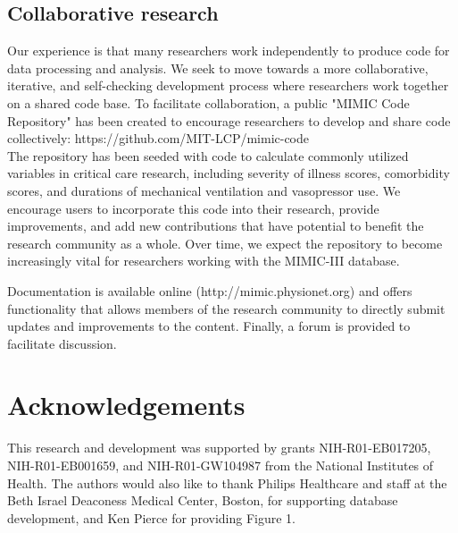 \documentclass[english]{article}
\begin{document}
\subsection*{Collaborative research}

Our experience is that many researchers work independently to produce code for data processing and analysis. We seek to move towards a more collaborative, iterative, and self-checking development process where researchers work together on a shared code base. To facilitate collaboration, a public "MIMIC Code Repository" has been created to encourage researchers to develop and share code collectively: https://github.com/MIT-LCP/mimic-code \\

The repository has been seeded with code to calculate commonly utilized variables in critical care research, including severity of illness scores, comorbidity scores, and durations of mechanical ventilation and vasopressor use.
We encourage users to incorporate this code into their research, provide improvements, and add new contributions that have potential to benefit the research community as a whole. Over time, we expect the repository to become increasingly vital for researchers working with the MIMIC-III database.


Documentation is available online (http://mimic.physionet.org) and offers functionality that allows members of the research community to directly submit updates and improvements to the content. Finally, a forum is provided to facilitate discussion.

\section*{Acknowledgements}


This research and development was supported by grants NIH-R01-EB017205, NIH-R01-EB001659, and NIH-R01-GW104987 from the National Institutes of Health. The authors would also like to thank Philips Healthcare and staff at the Beth Israel Deaconess Medical Center, Boston, for supporting database development, and Ken Pierce for providing Figure 1.
\end{document}
